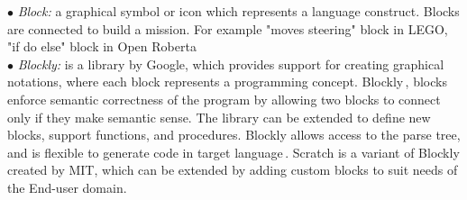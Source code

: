 $\bullet$ \emph{Block:} a graphical symbol or icon  which represents  a language construct.  Blocks are connected to build a mission. For example "moves steering" block in LEGO, "if do else" block in Open Roberta ~\cite{OpenRoberta}\\ %
$\bullet$ \emph{Blockly:} is a library by Google, which provides support for creating graphical notations, where each block represents a programming concept. %
Blockly\,\cite{blockly}, blocks enforce semantic correctness of the program by allowing two blocks to connect only if they make semantic sense.
The library can be extended to define new blocks, support functions, and procedures. Blockly allows access to the parse tree, and is flexible to generate code in target language\,\cite{Passault2016}. Scratch is a variant of Blockly created by MIT, which can be extended by adding custom blocks to suit needs of the End-user domain.

